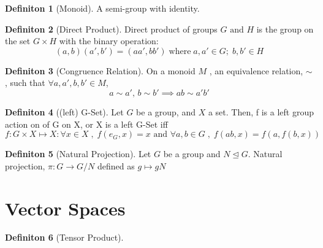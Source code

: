 \documentclass{article}
\theoremstyle{definition}
\theoremstyle{definition}
\newtheorem{definition}{Definiton}[section]
\begin{document}
\begin{definition}[Monoid] %
	A semi-group with identity.
\end{definition}

\begin{definition}[Direct Product] %
	Direct product of groups $ G \text{ and } H $ is the group on the set $ G \times H $ with the binary operation:
\[ (a,b)(a',b')=(aa',bb') \; \text{where} \; a,a' \in G; \; b,b' \in H\]
\end{definition}

\begin{definition}[Congruence Relation] %
On a monoid $ M $ , an equivalence relation, $ \sim $ , such that $ \forall a,a',b,b' \in M $,
\[ a \sim a' ,\, b\sim b' \implies ab \sim a'b'  \]
\end{definition}

\begin{definition}[(left) G-Set] %
Let $ G $ be a group, and $ X $ a set. Then, f is a left group action on of G on X, or X is a left G-Set iff
\[ f:G \times X \mapsto X : \forall x \in X \; , \;   f(e_G,x)=x \text{ and } \forall a,b \in G \; , \; f(ab,x)=f(a, f(b,x))  \]
\end{definition}

\begin{definition}[Natural Projection] %
Let $G$ be a group and $N \trianglelefteq G$. Natural projection, $\pi : G \rightarrow G/N$ defined as $g \mapsto gN$
\end{definition}

\section{Vector Spaces}

\begin{definition}[Tensor Product] %

\end{definition}
\end{document}
